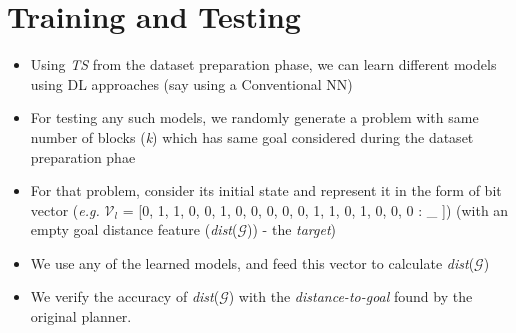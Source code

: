 \documentclass[]{article}
\begin{document}
\section{Training and Testing}
%
	\begin{itemize}
		\item Using \emph{TS} from the dataset preparation phase, we can learn different models using DL approaches (say using a Conventional NN)
		\item For testing any such models, we randomly generate a problem with same number of blocks (\emph{k}) which has same goal considered during the dataset preparation phae
		\item For that problem, consider its initial state and represent it in the form of bit vector (\emph{e.g.} $\mathcal{V}_l$ = [0, 1, 1, 0, 0, 1, 0, 0, 0, 0, 0, 1, 1, 0, 1, 0, 0, 0 : \_ ]) 
			(with an empty goal distance feature (\emph{dist}($\mathcal{G}$)) - the \emph{target})
		\item We use any of the learned models, and feed this vector to calculate \emph{dist}($\mathcal{G}$)
		\item We verify the accuracy of \emph{dist}($\mathcal{G}$) with the \emph{distance-to-goal} found by the original planner.
	\end{itemize}
%
%
\end{document}
